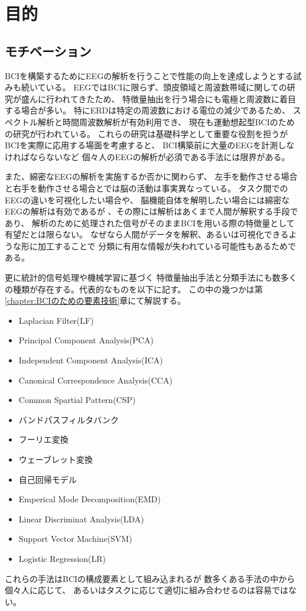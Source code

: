 \section{\mc 目的}
\subsection{\mc モチベーション}
BCIを構築するためにEEGの解析を行うことで性能の向上を達成しようとする試みも続いている\cite{脳波解析BCI,脳波分析BCI,ERSBCI}。
EEGではBCIに限らず、頭皮領域と周波数帯域に関しての研究が盛んに行われてきたため、
特徴量抽出を行う場合にも電極と周波数に着目する場合が多い。
特にERDは特定の周波数における電位の減少であるため、
スペクトル解析と時間周波数解析が有効利用でき、
現在も運動想起型BCIのための研究が行われている\cite{時間周波数解析の比較}。
これらの研究は基礎科学として重要な役割を担うが
BCIを実際に応用する場面を考慮すると、
BCI構築前に大量のEEGを計測しなければならないなど
個々人のEEGの解析が必須である手法には限界がある。

また、綿密なEEGの解析を実施するか否かに関わらず、
左手を動作させる場合と右手を動作させる場合とでは脳の活動は事実異なっている。
タスク間でのEEGの違いを可視化したい場合や、
脳機能自体を解明したい場合には綿密なEEGの解析は有効であるが
、その際には解析はあくまで人間が解釈する手段であり、
解析のために処理された信号がそのままBCIを用いる際の特徴量として有望だとは限らない。
なぜなら人間がデータを解釈、あるいは可視化できるような形に加工することで
分類に有用な情報が失われている可能性もあるためである。

更に統計的信号処理や機械学習に基づく
特徴量抽出手法と分類手法にも数多くの種類が存在する。代表的なものを以下に記す。
この中の幾つかは第\ref{chapter:BCIのための要素技術}章にて解説する。
\begin{itemize}
    \item Laplacian Filter(LF)
    \item Principal Component Analysis(PCA)
    \item Independent Component Analysis(ICA)
    \item Canonical Correspondence Analysis(CCA)
    \item Common Spartial Pattern(CSP)
    \item バンドパスフィルタバンク
    \item フーリエ変換
    \item ウェーブレット変換
    \item 自己回帰モデル
    \item Emperical Mode Decomposition(EMD)
    \item Linear Discriminat Analysis(LDA)
    \item Support Vector Machine(SVM)
    \item Logistic Regression(LR)
\end{itemize}
これらの手法はBCIの構成要素として組み込まれるが
数多くある手法の中から個々人に応じて、
あるいはタスクに応じて適切に組み合わせるのは容易ではない。


